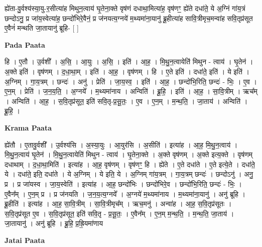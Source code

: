 \documentclass[17pt]{extarticle}
\begin{document}
ह्ये॑ता-वु॒र्वश्य॑स्या॒यु-र॒सीत्या॑ह मिथुन॒त्वाय॑ घृ॒तेना॒क्ते वृष॑णं दधाथा॒मित्या॑ह॒ वृष॑णꣳ॒॒ ह्ये॑ते दधा॑ते॒ ये अ॒ग्निं गा॑य॒त्रं छन्दोऽनु॒ प्र जा॑य॒स्वेत्या॑ह॒ छन्दो॑भिरे॒वैनं॒ प्र ज॑नयत्य॒ग्नये॑ म॒थ्यमा॑ना॒यानु॑ ब्रू॒हीत्या॑ह सावि॒त्रीमृच॒मन्वा॑ह सवि॒तृप्र॑सूत ए॒वैनं॑ मन्थति जा॒तायानु॑ ब्रूहि- [  ] \newline

\textbf{Pada Paata} \newline

हि । ए॒तौ । उ॒र्वशी᳚ । अ॒सि॒ । आ॒युः । अ॒सि॒ । इति॑ । आ॒ह॒ । मि॒थु॒न॒त्वायेति॑ मिथुन - त्वाय॑ । घृ॒तेन॑ । अ॒क्ते इति॑ । वृष॑णम् । द॒धा॒था॒म् । इति॑ । आ॒ह॒ । वृष॑णम् । हि । ए॒ते इति॑ । दधा॑ते॒ इति॑ । ये इति॑ । अ॒ग्निम् । गा॒य॒त्रम् । छन्दः॑ । अनु॑ । प्रेति॑ । जा॒य॒स्व॒ । इति॑ । आ॒ह॒ । छन्दो॑भि॒रिति॒ छन्दः॑ - भिः॒ । ए॒व । ए॒न॒म् । प्रेति॑ । ज॒न॒य॒ति॒ । अ॒ग्नये᳚ । म॒थ्यमा॑नाय । अन्विति॑ । ब्रू॒हि॒ । इति॑ । आ॒ह॒ । सा॒वि॒त्रीम् । ऋच᳚म् । अन्विति॑ । आ॒ह॒ । स॒वि॒तृप्र॑सूत॒ इति॑ सवि॒तृ-प्र॒सू॒तः॒ । ए॒व । ए॒न॒म् । म॒न्थ॒ति॒ । जा॒ताय॑ । अन्विति॑ । ब्रू॒हि॒ ।  \newline


\textbf{Krama Paata} \newline

ह्ये॑तौ । ए॒तावु॒र्वशी᳚ । उ॒र्वश्य॑सि । अ॒स्या॒युः । आ॒युर॑सि । अ॒सीति॑ । इत्या॑ह । आ॒ह॒ मि॒थु॒न॒त्वाय॑ । मि॒थु॒न॒त्वाय॑ घृ॒तेन॑ । मि॒थु॒न॒त्वायेति॑ मिथुन - त्वाय॑ । घृ॒तेना॒क्ते । अ॒क्ते वृष॑णम् । अ॒क्ते इत्य॒क्ते । वृष॑णम् दधाथाम् । द॒धा॒था॒मिति॑ । इत्या॑ह । आ॒ह॒ वृष॑णम् । वृष॑णꣳ॒॒ हि । ह्ये॑ते । ए॒ते दधा॑ते । ए॒ते इत्ये॒ते । दधा॑ते॒ ये । दधा॑ते॒ इति॒ दधा॑ते । ये अ॒ग्निम् । ये इति॒ ये । अ॒ग्निम् गा॑य॒त्रम् । गा॒य॒त्रम् छन्दः॑ । छन्दोऽनु॑ । अनु॒ प्र । प्र जा॑यस्व । जा॒य॒स्वेति॑ । इत्या॑ह । आ॒ह॒ छन्दो॑भिः । छन्दो॑भिरे॒व । छन्दो॑भि॒रिति॒ छन्दः॑ - भिः॒ । ए॒वैन᳚म् । ए॒न॒म् प्र । प्र ज॑नयति । ज॒न॒य॒त्य॒ग्नये᳚ । अ॒ग्नये॑ म॒थ्यमा॑नाय । म॒थ्यमा॑ना॒यानु॑ । अनु॑ ब्रूहि । ब्रू॒हीति॑ । इत्या॑ह । आ॒ह॒ सा॒वि॒त्रीम् । सा॒वि॒त्रीमृच᳚म् । ऋच॒मनु॑ । अन्वा॑ह । आ॒ह॒ स॒वि॒तृप्र॑सूतः । स॒वि॒तृप्र॑सूत ए॒व । स॒वि॒तृप्र॑सूत॒ इति॑ सवि॒तृ - प्र॒सू॒तः॒ । ए॒वैन᳚म् । ए॒न॒म् म॒न्थ॒ति॒ । म॒न्थ॒ति॒ जा॒ताय॑ । जा॒तायानु॑ । अनु॑ ब्रूहि । ब्रू॒हि॒ प्र॒ह्रि॒यमा॑णाय \newline

\textbf{Jatai Paata} \newline
\end{document}
